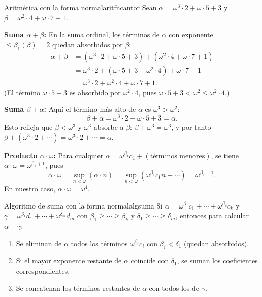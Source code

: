 \begin{ejemplo}{Aritmética con la forma normal}{aritfncantor}
Sean $\alpha = \omega^3 \cdot 2 + \omega \cdot 5 + 3$ y $\beta = \omega^2 \cdot 4 + \omega \cdot 7 + 1$.

\textbf{Suma $\alpha + \beta$:} En la suma ordinal, los términos de $\alpha$ con exponente $\leq \beta_1(\beta) = 2$ quedan absorbidos por $\beta$:
\begin{align*}
  \alpha + \beta
  &= (\omega^3 \cdot 2 + \omega \cdot 5 + 3) + (\omega^2 \cdot 4 + \omega \cdot 7 + 1) \\
  &= \omega^3 \cdot 2 + (\omega \cdot 5 + 3 + \omega^2 \cdot 4) + \omega \cdot 7 + 1 \\
  &= \omega^3 \cdot 2 + \omega^2 \cdot 4 + \omega \cdot 7 + 1.
\end{align*}
(El término $\omega \cdot 5 + 3$ es absorbido por $\omega^2 \cdot 4$, pues $\omega \cdot 5 + 3 < \omega^2 \leq \omega^2 \cdot 4$.)

\textbf{Suma $\beta + \alpha$:} Aquí el término más alto de $\alpha$ es $\omega^3 > \omega^2$:
\[
  \beta + \alpha = \omega^3 \cdot 2 + \omega \cdot 5 + 3 = \alpha.
\]
Esto refleja que $\beta < \omega^3$ y $\omega^3$ absorbe a $\beta$: $\beta + \omega^3 = \omega^3$, y por tanto $\beta + (\omega^3 \cdot 2 + \cdots) = \omega^3 \cdot 2 + \cdots = \alpha$.

\textbf{Producto $\alpha \cdot \omega$:} Para cualquier $\alpha = \omega^{\beta_1} c_1 + (\text{términos menores})$, se tiene $\alpha \cdot \omega = \omega^{\beta_1+1}$, pues
\[
  \alpha \cdot \omega = \sup_{n<\omega}(\alpha \cdot n)
  = \sup_{n<\omega}(\omega^{\beta_1} c_1 n + \cdots)
  = \omega^{\beta_1+1}.
\]
En nuestro caso, $\alpha \cdot \omega = \omega^4$.
\end{ejemplo}

\begin{corolario}{Algoritmo de suma con la forma normal}{algsuma}
Si $\alpha = \omega^{\beta_1} c_1 + \cdots + \omega^{\beta_k} c_k$ y $\gamma = \omega^{\delta_1} d_1 + \cdots + \omega^{\delta_m} d_m$ con $\beta_1 \geq \cdots \geq \beta_k$ y $\delta_1 \geq \cdots \geq \delta_m$, entonces para calcular $\alpha + \gamma$:
\begin{enumerate}[leftmargin=2em, label=(\arabic*)]
  \item Se eliminan de $\alpha$ todos los términos $\omega^{\beta_i} c_i$ con $\beta_i < \delta_1$ (quedan absorbidos).
  \item Si el mayor exponente restante de $\alpha$ coincide con $\delta_1$, se suman los coeficientes correspondientes.
  \item Se concatenan los términos restantes de $\alpha$ con todos los de $\gamma$.
\end{enumerate}
\end{corolario}

